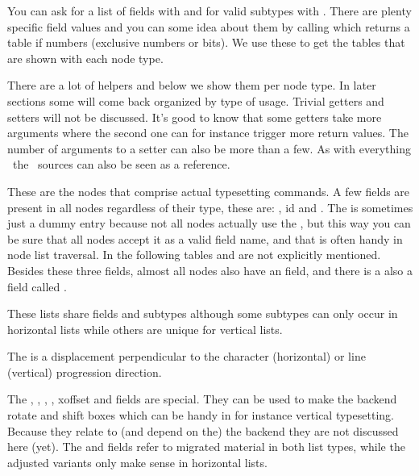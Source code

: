 \startfourrows
{}
\stopfourrows

You can ask for a list of fields with  and for valid subtypes
with . There are plenty specific field values and you can
some idea about them by calling  which returns a table if
numbers (exclusive numbers or bits). We use these to get the tables that are
shown with each node type.

There are a lot of helpers and below we show them per node type. In later
sections some will come back organized by type of usage. Trivial getters and
setters will not be discussed. It's good to know that some getters take more
arguments where the second one can for instance trigger more return values. The
number of arguments to a setter can also be more than a few. As with everything
\LUAMETATEX\ the \CONTEXT\ sources can also be seen as  a reference.

\stopsection

\startsection[title={Main text nodes}]

These are the nodes that comprise actual typesetting commands. A few fields are
present in all nodes regardless of their type, these are: , \type
{id} and . The  is sometimes just a dummy entry
because not all nodes actually use the , but this way you can be
sure that all nodes accept it as a valid field name, and that is often handy in
node list traversal. In the following tables  and  are not
explicitly mentioned. Besides these three fields, almost all nodes also have an
 field, and there is a also a field called .

\startsubsection[title={hlist and vlist, aka boxes}]

These lists share fields and subtypes although some subtypes can only occur in
horizontal lists while others are unique for vertical lists.


The  is a displacement perpendicular to the character (horizontal) or
line (vertical) progression direction.

The , , , , \type
{xoffset} and  fields are special. They can be used to make the
backend rotate and shift boxes which can be handy in for instance vertical
typesetting. Because they relate to (and depend on the) the backend they are not
discussed here (yet). The  and  fields refer to migrated
material in both list types, while the adjusted variants only make sense in
horizontal lists.

